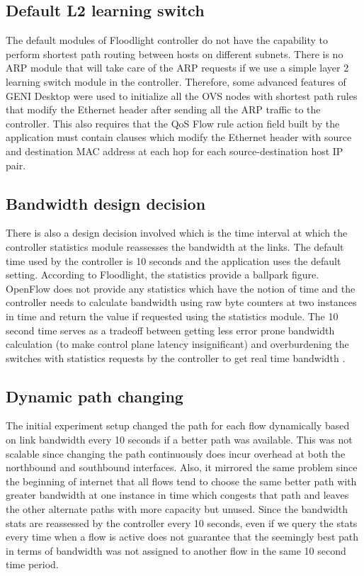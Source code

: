 \documentclass[paper=a4, fontsize=12pt]{scrartcl}	%
\numberwithin{equation}{section}		%
\numberwithin{figure}{section}			%
\numberwithin{table}{section}				%
\begin{document}
\subsection{Default L2 learning switch}
The default modules of Floodlight controller do not have the capability to perform shortest path routing between hosts on different subnets. There is no ARP module that will take care of the ARP requests if we use a simple layer 2 learning switch module in the controller. Therefore, some advanced features of GENI Desktop were used to initialize all the OVS nodes with shortest path rules that modify the Ethernet header after sending all the ARP traffic to the controller. This also requires that the QoS Flow rule action field built by the application must contain clauses which modify the Ethernet header with source and destination MAC address at each hop for each source-destination host IP pair.
\subsection{Bandwidth design decision}
There is also a design decision involved which is the time interval at which the controller statistics module reassesses the bandwidth at the links. The default time used by the controller is 10 seconds and the application uses the default setting. According to Floodlight, the statistics provide a ballpark figure. OpenFlow does not provide any statistics which have the notion of time and the controller needs to calculate bandwidth using raw byte counters at two instances in time and return the value if requested using the statistics module. The 10 second time serves as a tradeoff between getting less error prone bandwidth calculation (to make control plane latency insignificant) and overburdening the switches with statistics requests by the controller to get real time bandwidth \cite{stats}.
\subsection{Dynamic path changing}
The initial experiment setup changed the path for each flow dynamically based on link bandwidth every 10 seconds if a better path was available. This was not scalable since changing the path continuously does incur overhead at both the northbound and southbound interfaces. Also, it mirrored the same problem since the beginning of internet that all flows tend to choose the same better path with greater bandwidth at one instance in time which congests that path and leaves the other alternate paths with more capacity but unused. Since the bandwidth stats are reassessed by the controller every 10 seconds, even if we query the stats every time when a flow is active does not guarantee that the seemingly best path in terms of bandwidth was not assigned to another flow in the same 10 second time period.
\end{document}
